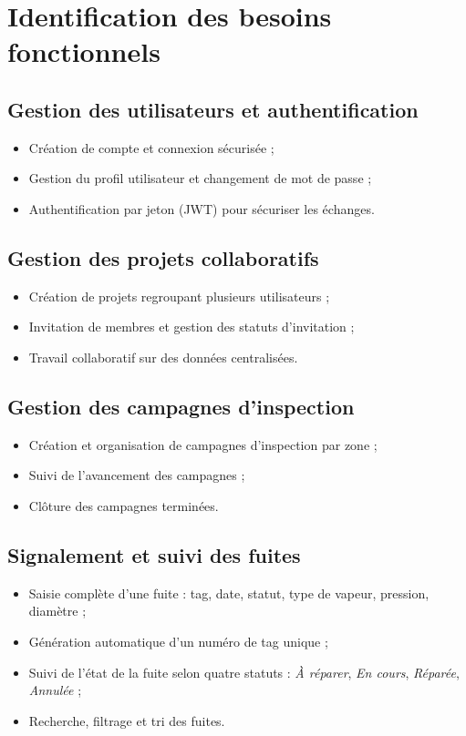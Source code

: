 \documentclass[12pt,a4paper,oneside]{report}
\begin{document}
\section{Identification des besoins fonctionnels}

\subsection{Gestion des utilisateurs et authentification}
\begin{itemize}
    \item Création de compte et connexion sécurisée ;
    \item Gestion du profil utilisateur et changement de mot de passe ;
    \item Authentification par jeton (JWT) pour sécuriser les échanges.
\end{itemize}

\subsection{Gestion des projets collaboratifs}
\begin{itemize}
    \item Création de projets regroupant plusieurs utilisateurs ;
    \item Invitation de membres et gestion des statuts d'invitation ;
    \item Travail collaboratif sur des données centralisées.
\end{itemize}

\subsection{Gestion des campagnes d'inspection}
\begin{itemize}
    \item Création et organisation de campagnes d'inspection par zone ;
    \item Suivi de l'avancement des campagnes ;
    \item Clôture des campagnes terminées.
\end{itemize}

\subsection{Signalement et suivi des fuites}
\begin{itemize}
    \item Saisie complète d'une fuite : tag, date, statut, type de vapeur, pression, diamètre ;
    \item Génération automatique d'un numéro de tag unique ;
    \item Suivi de l'état de la fuite selon quatre statuts : \textit{À réparer}, \textit{En cours}, \textit{Réparée}, \textit{Annulée} ;
    \item Recherche, filtrage et tri des fuites.
\end{itemize}
\end{document}
